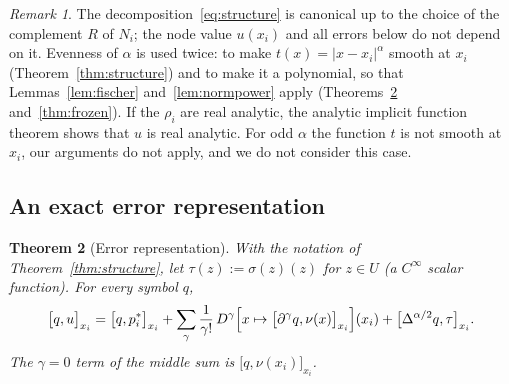 \documentclass[12pt]{amsart}
\newtheorem{theorem}{Theorem}[section]
\theoremstyle{definition}
\theoremstyle{remark}
\newtheorem{remark}[theorem]{Remark}
\newcommand{\fpz}[3]{\bigl[#1,#2\bigr]_{#3}}     %
\begin{document}
\begin{remark}\label{rem:odd}
The decomposition~\eqref{eq:structure} is canonical up to the choice of the complement $R$ of
$N_i$; the node value $u(x_i)$ and all errors below do not depend on it. Evenness of $\alpha$
is used twice: to make $t(x)=|x-x_i|^\alpha$ smooth at $x_i$ (Theorem~\ref{thm:structure}) and
to make it a polynomial, so that Lemmas~\ref{lem:fischer} and~\ref{lem:normpower} apply
(Theorems~\ref{thm:error} and~\ref{thm:frozen}). If the $\rho_i$ are real analytic, the
analytic implicit function theorem shows that $u$ is real analytic. For odd $\alpha$ the function
$t$ is not smooth at $x_i$, our arguments do not apply, and we do not consider this case.
\end{remark}

\subsection{An exact error representation}

\begin{theorem}[Error representation]\label{thm:error}
With the notation of Theorem~\ref{thm:structure}, let $\tau(z):=\sigma(z)(z)$ for $z\in U$
(a $C^\infty$ scalar function). For every symbol $q$,
\begin{equation}\label{eq:error}
  \fpz{q}{u}{x_i}
  =\fpz{q}{p_i^*}{x_i}
  +\sum_{\gamma}\frac{1}{\gamma!}\,D^\gamma\Bigl[x\mapsto\fpz{\partial^\gamma q}{\nu(x)}{x_i}\Bigr](x_i)
  +\fpz{\Delta^{\alpha/2}q}{\tau}{x_i}.
\end{equation}
The $\gamma=0$ term of the middle sum is $\fpz{q}{\nu(x_i)}{x_i}$.
\end{theorem}
\end{document}

